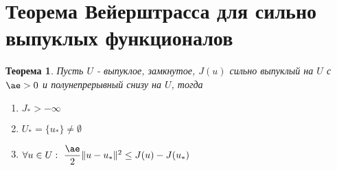 \documentclass[9pt, a4paper]{extarticle}
\newtheorem*{theorem}{Теорема}
\begin{document}
\section{Теорема Вейерштрасса для сильно выпуклых функционалов}
	\begin{theorem}
		Пусть $U$ - выпуклое, замкнутое, $J(u)$ сильно выпуклый на $U$ с $\ae > 0$ и полунепрерывный снизу на $U$, тогда
		\begin{enumerate}
			\item $J_* > - \infty$
			\item $U_* = \{u_*\} \neq \emptyset$
			\item $\forall u \in U: \ \dfrac\ae2 \|u - u_*\|^2 \leq J(u) - J(u_*)$
		\end{enumerate}
	\end{theorem}
\end{document}
